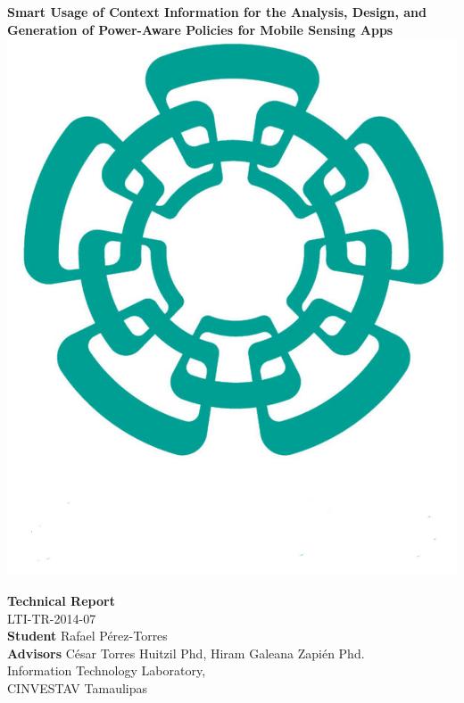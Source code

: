 \documentclass[12pt]{article}
\numberwithin{equation}{section}
\numberwithin{table}{section}
\numberwithin{figure}{section}
\begin{document}

\begin{center}
\textbf{\Large Smart Usage of Context Information for the Analysis, Design, and Generation of Power-Aware Policies for Mobile Sensing Apps} \\[16pt]

\includegraphics[scale=0.08]{cinvestav2.jpg}

\textbf{Technical Report}\\[6pt]
LTI-TR-2014-07 \\[16pt]

\textbf{Student} Rafael Pérez-Torres \\[6pt]
\textbf{Advisors} César Torres Huitzil Phd, Hiram Galeana Zapién Phd.\\[16pt]

Information Technology Laboratory,\\
CINVESTAV Tamaulipas \\[16pt]

\end{center}
\end{document}
